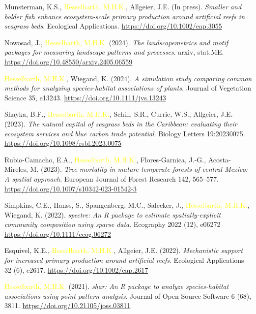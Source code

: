 \documentclass[hidelinks]{report}
\begin{document}
\begin{hangparas}{7.5mm}{1}

Munsterman, K.S., \textcolor{yellow}{Hesselbarth, M.H.K.}, Allgeier, J.E. (In press). \textit{Smaller and bolder fish enhance ecosystem-scale primary production around artificial reefs in seagrass beds}. Ecological Applications. \url{https://doi.org/10.1002/eap.3055}
		
Nowosad, J., \textcolor{yellow}{Hesselbarth, M.H.K.} (2024). \textit{The landscapemetrics and motif packages for measuring landscape patterns and processes}. arxiv, stat.ME. \url{https://doi.org/10.48550/arxiv.2405.06559}

\textcolor{yellow}{Hesselbarth, M.H.K.}, Wiegand, K. (2024). \textit{A simulation study comparing common methods for analyzing species-habitat associations of plants.} Journal of Vegetation Science 35, e13243. \url{https://doi.org/10.1111/jvs.13243}
	
Shayka, B.F., \textcolor{yellow}{Hesselbarth, M.H.K.}, Schill, S.R., Currie, W.S., Allgeier, J.E. (2023). \textit{The natural capital of seagrass beds in the Caribbean: evaluating their ecosystem services and blue carbon trade potential}. Biology Letters 19:20230075. \url{https://doi.org/10.1098/rsbl.2023.0075}
	
Rubio-Camacho, E.A., \textcolor{yellow}{Hesselbarth, M.H.K.}, Flores-Garnica, J.-G., Acosta-Mireles, M. (2023). \textit{Tree mortality in mature temperate forests of central Mexico: A spatial approach}. European Journal of Forest Research 142, 565–577. \url{https://doi.org/10.1007/s10342-023-01542-3}

Simpkins, C.E., Hanss, S., Spangenberg, M.C., Salecker, J., \textcolor{yellow}{Hesselbarth, M.H.K.}, Wiegand, K. (2022). \textit{spectre: An R package to estimate spatially-explicit community composition using sparse data}. Ecography 2022 (12), e06272 \url{https://doi.org/10.1111/ecog.06272}

Esquivel, K.E.\textcolor{grey}{\Cross}, \textcolor{yellow}{Hesselbarth, M.H.K.}\textcolor{grey}{\Cross}, Allgeier, J.E. (2022). \textit{Mechanistic support for increased primary production around artificial reefs}. Ecological Applications 32 (6), e2617. \url{https://doi.org/10.1002/eap.2617}

\textcolor{yellow}{Hesselbarth, M.H.K.} (2021). \textit{shar: An R package to analyze species-habitat associations using point pattern analysis}. Journal of Open Source Software 6 (68), 3811. \url{https://doi.org/10.21105/joss.03811}


\end{hangparas}
\end{document}

